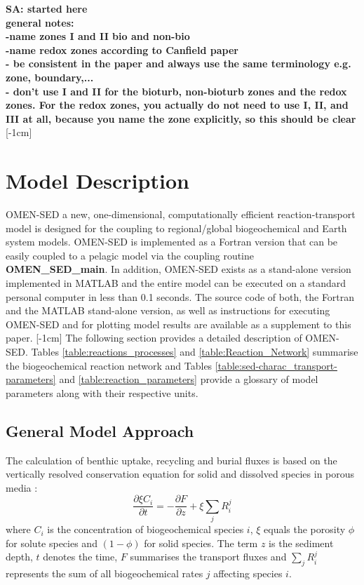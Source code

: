 \documentclass[gmd, manuscript]{copernicus}
\begin{document}
\textbf{SA: started here\\
general notes:\\
-name zones I and II bio and non-bio\\
-name redox zones according to Canfield paper\\
- be consistent in the paper and always use the same terminology e.g. zone, boundary,... \\
- don't use I and II for the bioturb, non-bioturb zones and the redox zones. For the redox zones, you actually do not need to use I, II, and III at all, because you name the zone explicitly, so this should be clear}
[-1cm]%

\section{Model Description}
OMEN-SED a new, one-dimensional, computationally efficient reaction-transport model is designed for the coupling to regional/global biogeochemical and Earth system models. 
OMEN-SED is implemented as a Fortran version that can be easily coupled to a pelagic model via the coupling routine \textsf{\textbf{OMEN\_SED\_main}}. 
In addition, OMEN-SED exists as a stand-alone version implemented in MATLAB and the entire model can be executed on a standard personal computer in less than 0.1 seconds. 
The source code of both, the Fortran and the MATLAB stand-alone version, as well as instructions for executing OMEN-SED and for plotting model results are available as a supplement to this paper.
[-1cm]%
The following section provides a detailed description of OMEN-SED. Tables \ref{table:reactions_processes} and \ref{table:Reaction_Network} summarise the biogeochemical reaction network and Tables \ref{table:sed-charac_transport-parameters} 
and \ref{table:reaction_parameters} provide a glossary of model parameters along with their respective units.

\subsection {General Model Approach} \label{subsec:GeneralModelApproach}
The calculation of benthic uptake, recycling and burial fluxes is based on the vertically resolved conservation equation for solid and dissolved species in porous media 
\citep[e.g.][]{berner_early_1980, boudreau1997diagenetic}:
\begin{equation} 
\frac{\partial \xi C_i}{\partial t}=-\frac{\partial F}{\partial z}+\xi \sum_j R_i^j \label{eq:Eq_generaldiagenetic}
\end{equation}
where $C_i$ is the concentration of biogeochemical species $i$, $\xi$ equals the porosity $\phi$ for solute species and $(1-\phi)$ for solid species. The term $z$ is the sediment depth, $t$ denotes the time, 
$F$ summarises the transport fluxes and $\sum_j R_i^j$ represents the sum of all biogeochemical rates $j$ affecting species $i$. 
\end{document}
